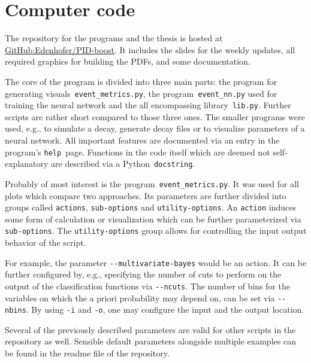 \chapter{Computer code}
\label{chap:computer_code}

The repository for the programs and the thesis is hosted at \href{https://github.com/Edenhofer/PID-boost}{GitHub:Edenhofer/PID-boost}. It includes the slides for the weekly updates, all required graphics for building the PDFs, and some documentation.

The core of the program is divided into three main parts: the program for generating visuals~\lstinline|event_metrics.py|, the program~\lstinline|event_nn.py| used for training the neural network and the all encompassing library~\lstinline|lib.py|. Further scripts are rather short compared to those three ones. The smaller programs were used, e.g., to simulate a decay, generate decay files or to visualize parameters of a neural network. All important features are documented via an entry in the program's \lstinline|help|~page. Functions in the code itself which are deemed not self-explanatory are described via a Python~\lstinline|docstring|.

Probably of most interest is the program~\lstinline|event_metrics.py|. It was used for all plots which compare two approaches. Its parameters are further divided into groups called \lstinline|actions|, \lstinline|sub-options| and \lstinline|utility-options|. An \lstinline|action| induces some form of calculation or visualization which can be further parameterized via \lstinline|sub-options|. The \lstinline|utility-options| group allows for controlling the input output behavior of the script.

For example, the parameter \lstinline|--multivariate-bayes| would be an action. It can be further configured by, e.g., specifying the number of cuts to perform on the output of the classification functions via \lstinline|--ncuts|. The number of bins for the variables on which the a priori probability may depend on, can be set via \lstinline|--nbins|. By using \lstinline|-i| and \lstinline|-o|, one may configure the input and the output location.

Several of the previously described parameters are valid for other scripts in the repository as well. Sensible default parameters alongside multiple examples can be found in the readme file of the repository.
